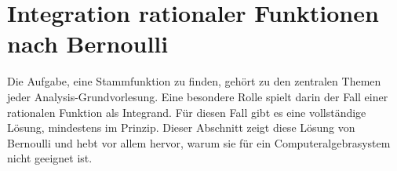 %
%
%
\section{Integration rationaler Funktionen nach Bernoulli
\label{buch:ratint:section:bernoulli}}
%
Die Aufgabe, eine Stammfunktion zu finden, gehört zu den zentralen 
Themen jeder Analy\-sis-Grundvorlesung.
Eine besondere Rolle spielt darin der Fall einer rationalen
Funktion als Integrand.
Für diesen Fall gibt es eine vollständige Lösung, mindestens
im Prinzip.
Dieser Abschnitt zeigt diese Lösung von Bernoulli und hebt vor
allem hervor, warum sie für ein Computeralgebrasystem nicht
geeignet ist.





